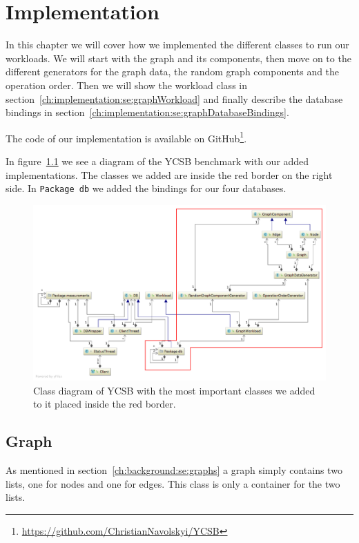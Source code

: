 \chapter{Implementation}
\label{ch:implementation}
In this chapter we will cover how we implemented the different classes to run our workloads.
We will start with the graph and its components,
then move on to the different generators for the graph data,
the random graph components and the operation order.
Then we will show the workload class in section~\ref{ch:implementation:se:graphWorkload} and finally describe the database bindings in section~\ref{ch:implementation:se:graphDatabaseBindings}.

The code of our implementation is available on GitHub\footnote{\url{https://github.com/ChristianNavolskyi/YCSB}}.

In figure~\ref{fig:YCSBExtension} we see a diagram of the YCSB benchmark with our added implementations.
The classes we added are inside the red border on the right side.
In \texttt{Package db} we added the bindings for our four databases.

\begin{figure}
  \includegraphics[angle=90,height=\textheight]{images/benchmarks/extendedYCSBWorkflow}
  \caption{Class diagram of YCSB with the most important classes we added to it placed inside the red border.}
  \label{fig:YCSBExtension}
\end{figure}

\section{Graph}
As mentioned in section~\ref{ch:background:se:graphs} a graph simply contains two lists,
one for nodes and one for edges.
This class is only a container for the two lists.

